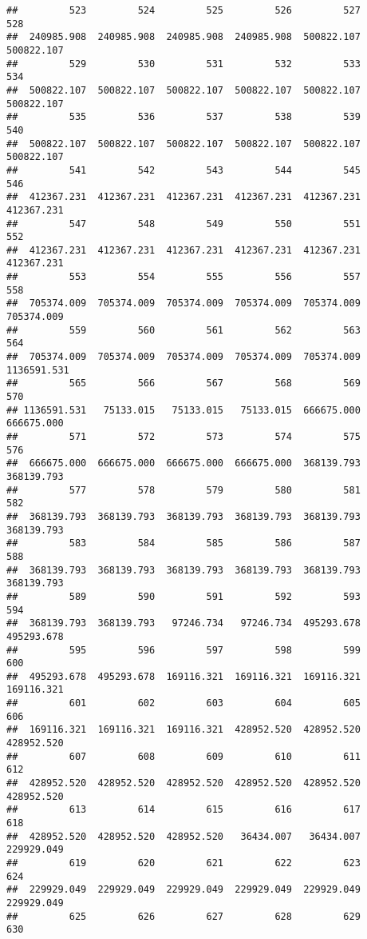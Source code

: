 \documentclass[
]{book}
\begin{document}
\begin{verbatim}
##         523         524         525         526         527         528 
##  240985.908  240985.908  240985.908  240985.908  500822.107  500822.107 
##         529         530         531         532         533         534 
##  500822.107  500822.107  500822.107  500822.107  500822.107  500822.107 
##         535         536         537         538         539         540 
##  500822.107  500822.107  500822.107  500822.107  500822.107  500822.107 
##         541         542         543         544         545         546 
##  412367.231  412367.231  412367.231  412367.231  412367.231  412367.231 
##         547         548         549         550         551         552 
##  412367.231  412367.231  412367.231  412367.231  412367.231  412367.231 
##         553         554         555         556         557         558 
##  705374.009  705374.009  705374.009  705374.009  705374.009  705374.009 
##         559         560         561         562         563         564 
##  705374.009  705374.009  705374.009  705374.009  705374.009 1136591.531 
##         565         566         567         568         569         570 
## 1136591.531   75133.015   75133.015   75133.015  666675.000  666675.000 
##         571         572         573         574         575         576 
##  666675.000  666675.000  666675.000  666675.000  368139.793  368139.793 
##         577         578         579         580         581         582 
##  368139.793  368139.793  368139.793  368139.793  368139.793  368139.793 
##         583         584         585         586         587         588 
##  368139.793  368139.793  368139.793  368139.793  368139.793  368139.793 
##         589         590         591         592         593         594 
##  368139.793  368139.793   97246.734   97246.734  495293.678  495293.678 
##         595         596         597         598         599         600 
##  495293.678  495293.678  169116.321  169116.321  169116.321  169116.321 
##         601         602         603         604         605         606 
##  169116.321  169116.321  169116.321  428952.520  428952.520  428952.520 
##         607         608         609         610         611         612 
##  428952.520  428952.520  428952.520  428952.520  428952.520  428952.520 
##         613         614         615         616         617         618 
##  428952.520  428952.520  428952.520   36434.007   36434.007  229929.049 
##         619         620         621         622         623         624 
##  229929.049  229929.049  229929.049  229929.049  229929.049  229929.049 
##         625         626         627         628         629         630 

\end{verbatim}
\end{document}
